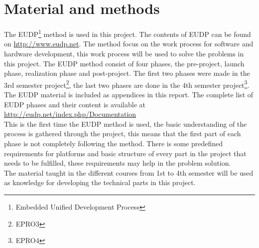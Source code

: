 \chapter{Material and methods}
The EUDP\footnote{Embedded Unified Development Process} method is used in this project. The contents of EUDP can be found on \url{http://www.eudp.net}. The method focus on the work process for software and hardware development, this work process will be used to solve the problems in this project. 
\p
The EUDP method consist of four phases, the pre-project, launch phase, realization phase and post-project. The first two phases were made in the 3rd semester project\footnote{EPRO3}, the last two phases are done in the 4th semester project\footnote{EPRO4}. The EUDP material is included as appendices in this report. The complete list of EUDP phases and their content is available at \url{http://eudp.net/index.php/Documentation}\\
\p
This is the first time the EUDP method is used, the basic understanding of the process is gathered through the project, this means that the first part of each phase is not completely following the method.
There is some predefined requirements for platforms and basic structure of every part in the project that needs to be fulfilled, these requirements may help in the problem solution.\\
The material taught in the different courses from 1st to 4th semester will be used as knowledge for developing the technical parts in this project.\\